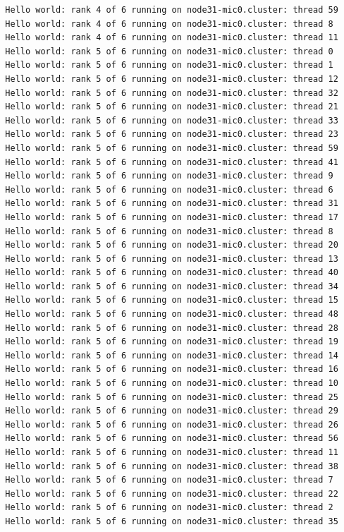 \documentclass[pscyr,10pt]{hedlab}
\begin{document}
\begin{lstlisting}
  Hello world: rank 4 of 6 running on node31-mic0.cluster: thread 59
  Hello world: rank 4 of 6 running on node31-mic0.cluster: thread 8
  Hello world: rank 4 of 6 running on node31-mic0.cluster: thread 11
  Hello world: rank 5 of 6 running on node31-mic0.cluster: thread 0
  Hello world: rank 5 of 6 running on node31-mic0.cluster: thread 1
  Hello world: rank 5 of 6 running on node31-mic0.cluster: thread 12
  Hello world: rank 5 of 6 running on node31-mic0.cluster: thread 32
  Hello world: rank 5 of 6 running on node31-mic0.cluster: thread 21
  Hello world: rank 5 of 6 running on node31-mic0.cluster: thread 33
  Hello world: rank 5 of 6 running on node31-mic0.cluster: thread 23
  Hello world: rank 5 of 6 running on node31-mic0.cluster: thread 59
  Hello world: rank 5 of 6 running on node31-mic0.cluster: thread 41
  Hello world: rank 5 of 6 running on node31-mic0.cluster: thread 9
  Hello world: rank 5 of 6 running on node31-mic0.cluster: thread 6
  Hello world: rank 5 of 6 running on node31-mic0.cluster: thread 31
  Hello world: rank 5 of 6 running on node31-mic0.cluster: thread 17
  Hello world: rank 5 of 6 running on node31-mic0.cluster: thread 8
  Hello world: rank 5 of 6 running on node31-mic0.cluster: thread 20
  Hello world: rank 5 of 6 running on node31-mic0.cluster: thread 13
  Hello world: rank 5 of 6 running on node31-mic0.cluster: thread 40
  Hello world: rank 5 of 6 running on node31-mic0.cluster: thread 34
  Hello world: rank 5 of 6 running on node31-mic0.cluster: thread 15
  Hello world: rank 5 of 6 running on node31-mic0.cluster: thread 48
  Hello world: rank 5 of 6 running on node31-mic0.cluster: thread 28
  Hello world: rank 5 of 6 running on node31-mic0.cluster: thread 19
  Hello world: rank 5 of 6 running on node31-mic0.cluster: thread 14
  Hello world: rank 5 of 6 running on node31-mic0.cluster: thread 16
  Hello world: rank 5 of 6 running on node31-mic0.cluster: thread 10
  Hello world: rank 5 of 6 running on node31-mic0.cluster: thread 25
  Hello world: rank 5 of 6 running on node31-mic0.cluster: thread 29
  Hello world: rank 5 of 6 running on node31-mic0.cluster: thread 26
  Hello world: rank 5 of 6 running on node31-mic0.cluster: thread 56
  Hello world: rank 5 of 6 running on node31-mic0.cluster: thread 11
  Hello world: rank 5 of 6 running on node31-mic0.cluster: thread 38
  Hello world: rank 5 of 6 running on node31-mic0.cluster: thread 7
  Hello world: rank 5 of 6 running on node31-mic0.cluster: thread 22
  Hello world: rank 5 of 6 running on node31-mic0.cluster: thread 2
  Hello world: rank 5 of 6 running on node31-mic0.cluster: thread 35

\end{lstlisting}
\end{document}
